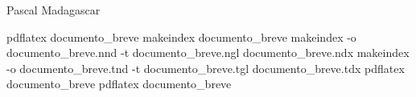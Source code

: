 
\usepackage{index}

Pascal
Madagascar

\printindex %
\printindex[luoghi] %


pdflatex documento_breve
makeindex documento_breve
makeindex -o documento_breve.nnd -t documento_breve.ngl documento_breve.ndx
makeindex -o documento_breve.tnd -t documento_breve.tgl documento_breve.tdx
pdflatex documento_breve
pdflatex documento_breve
